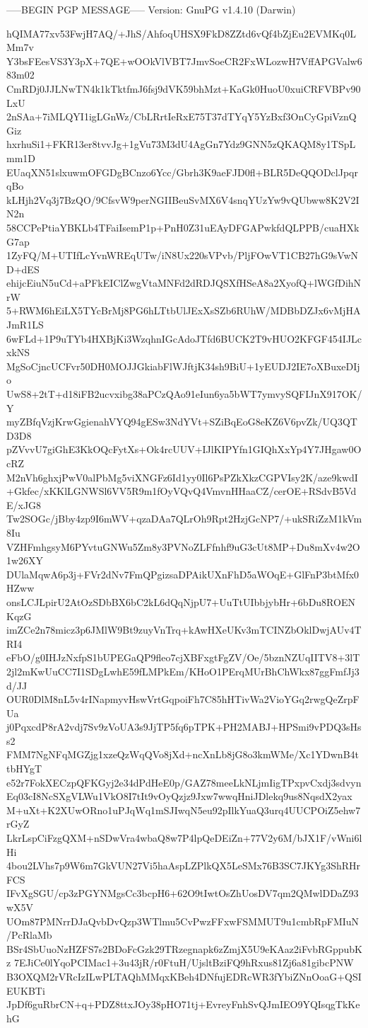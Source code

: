 -----BEGIN PGP MESSAGE-----
Version: GnuPG v1.4.10 (Darwin)

hQIMA77xv53FwjH7AQ/+JhS/AhfoqUHSX9FkD8ZZtd6vQf4bZjEu2EVMKq0LMm7v
Y3bsFEesVS3Y3pX+7QE+wOOkVlVBT7JmvSoeCR2FxWLozwH7VffAPGValw683m02
CmRDj0JJLNwTN4k1kTktfmJ6fsj9dVK59bhMzt+KaGk0HuoU0xuiCRFVBPv90LxU
2nSAa+7iMLQYI1igLGnWz/CbLRrtIeRxE75T37dTYqY5YzBxf3OnCyGpiVznQGiz
hxrhuSi1+FKR13er8tvvJg+1gVu73M3dU4AgGn7Ydz9GNN5zQKAQM8y1TSpLmm1D
EUaqXN51slxuwmOFGDgBCnzo6Ycc/Gbrh3K9aeFJD0fl+BLR5DeQQODclJpqrqBo
kLHjh2Vq3j7BzQO/9CfsvW9perNGIIBeuSvMX6V4snqYUzYw9vQUbww8K2V2IN2n
58CCPePtiaYBKLb4TFaiIsemP1p+PnH0Z31uEAyDFGAPwkfdQLPPB/cuaHXkG7ap
1ZyFQ/M+UTIfLcYvnWREqUTw/iN8Ux220sVPvb/PljFOwVT1CB27hG9sVwND+dES
ehijcEiuN5uCd+aPFkEIClZwgVtaMNFd2dRDJQSXfHSeA8a2XyofQ+lWGfDihNrW
5+RWM6hEiLX5TYcBrMj8PG6hLTtbUlJExXsSZb6RUhW/MDBbDZJx6vMjHAJmR1LS
6wFLd+1P9uTYb4HXBjKi3WzqhnIGcAdoJTfd6BUCK2T9vHUO2KFGF454IJLcxkNS
MgSoCjncUCFvr50DH0MOJJGkiabFlWJftjK34sh9BiU+1yEUDJ2IE7oXBuxeDIjo
UwS8+2tT+d18iFB2ucvxibg38aPCzQAo91eIun6ya5bWT7ymvySQFIJnX917OK/Y
myZBfqVzjKrwGgienahVYQ94gESw3NdYVt+SZiBqEoG8eKZ6V6pvZk/UQ3QTD3D8
pZVvvU7giGhE3KkOQcFytXs+Ok4rcUUV+IJlKIPYfn1GIQhXxYp4Y7JHgaw0OcRZ
M2nVh6ghxjPwV0alPbMg5viXNGFz6Id1yy0Il6PsPZkXkzCGPVIsy2K/aze9kwdI
+Gkfec/xKKlLGNWSl6VV5R9m1fOyVQvQ4VmvnHHaaCZ/cerOE+RSdvB5VdE/xJG8
Tw2SOGc/jBby4zp9I6mWV+qzaDAa7QLrOh9Rpt2HzjGcNP7/+ukSRiZzM1kVm8Iu
VZHFmhgsyM6PYvtuGNWu5Zm8y3PVNoZLFfnhf9uG3cUt8MP+Du8mXv4w2O1w26XY
DUlaMqwA6p3j+FVr2dNv7FmQPgizsaDPAikUXnFhD5aWOqE+GlFnP3btMfx0HZww
onsLCJLpirU2AtOzSDbBX6bC2kL6dQqNjpU7+UuTtUIbbjybHr+6bDu8ROENKqzG
imZCe2n78micz3p6JMlW9Bt9zuyVnTrq+kAwHXeUKv3mTCINZbOklDwjAUv4TRI4
eFbO/g0IHJzNxfpS1bUPEGaQP9fleo7cjXBFxgtFgZV/Oe/5bznNZUqIITV8+3lT
2jl2mKwUuCC7I1SDgLwhE59fLMPkEm/KHoO1PErqMUrBhChWkx87ggFmfJj3d/JJ
OUR0DlM8nL5v4rINapmyvHswVrtGqpoiFh7C85hHTivWa2VioYGq2rwgQeZrpFUa
j0PqxcdP8rA2vdj7Sv9zVoUA3s9JjTP5fq6pTPK+PH2MABJ+HPSmi9vPDQ3sHss2
FMM7NgNFqMGZjg1xzeQzWqQVo8jXd+ncXnLb8jG8o3kmWMe/Xc1YDwnB4ttbHYgT
e52r7FokXECzpQFKGyj2e34dPdHeE0p/GAZ78meeLkNLjmIigTPxpvCxdj3sdvyn
Eq03cI8NcSXgVLWu1VkO8I7tIt9vOyQzjz9Jxw7wwqHniJDlekq9us8NqsdX2yax
M+uXt+K2XUwORno1uPJqWq1mSJIwqN5eu92pIlkYuaQ3urq4UUCPOiZ5ehw7rGyZ
LkrLspCiFzgQXM+nSDwVra4wbaQ8w7P4lpQeDEiZn+77V2y6M/bJX1F/vWni6lHi
4bou2LVhs7p9W6m7GkVUN27Vi5haAspLZPlkQX5LeSMx76B3SC7JKYg3ShRHrFCS
IFvXgSGU/cp3zPGYNMgsCc3bcpH6+62O9tIwtOsZhUosDV7qm2QMwlDDaZ93wX5V
UOm87PMNrrDJaQvbDvQzp3WTlmu5CvPwzFFxwFSMMUT9u1cmbRpFMIuN/PcRlaMb
BSr4SbUuoNzHZFS7s2BDoFcGzk29TRzegnapk6zZmjX5U9eKAaz2iFvbRGppubKz
7EJiCe0lYqoPCIMac1+3u43jR/r0FtuH/UjsltBziFQ9hRxus81Zj6a81gibcPNW
B3OXQM2rVRcIzILwPLTAQhMMqxKBeh4DNfujEDRcWR3fYbiZNnOoaG+QSIEUKBTi
JpDf6guRbrCN+q+PDZ8ttxJOy38pHO71tj+EvreyFnhSvQJmIEO9YQIsqgTkKehG
